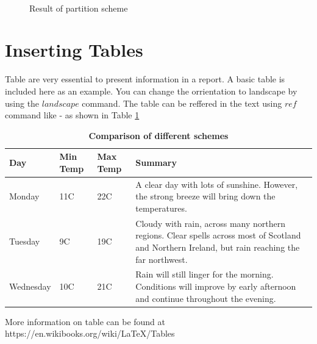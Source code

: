 \begin{figure}[H]
{	} \\
	\caption{Result of partition scheme}
	\label{fig:partitionscheme}
\end{figure}

\section{Inserting Tables}
Table are very essential to present information in a report. A basic table is included here as an example. You can change the orrientation to landscape by using the $landscape$ command. The table can be reffered in the text using $ref$ command like - as shown in Table \ref{weather} 

\begin{table}[H]
\begin{center}
	\caption{\bf Comparison of different schemes}
	\label{weather}
	\begin{tabular}{ | l | l | l | p{5cm} |}
		\hline
		\textbf{Day} & \textbf{Min Temp} & \textbf{Max Temp} & \textbf{Summary} \\ \hline
		Monday & 11C & 22C & A clear day with lots of sunshine.  
		However, the strong breeze will bring down the temperatures. \\ \hline
		Tuesday & 9C & 19C & Cloudy with rain, across many northern regions. Clear spells 
		across most of Scotland and Northern Ireland, 
		but rain reaching the far northwest. \\ \hline
		Wednesday & 10C & 21C & Rain will still linger for the morning. 
		Conditions will improve by early afternoon and continue 
		throughout the evening. \\
		\hline

	\end{tabular}
\end{center}
\end{table}

More information on table can be found at\\ https://en.wikibooks.org/wiki/LaTeX/Tables